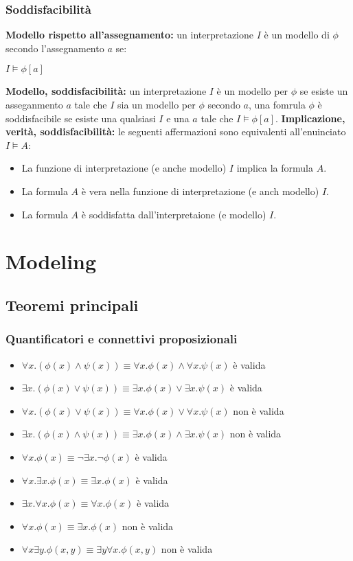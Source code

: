 \documentclass[../main.tex]{subfiles}
\newcommand{\spazio}{\vspace{1em} \newline}
\begin{document}
   \subsection{Soddisfacibilità}
   \textbf{Modello rispetto all'assegnamento:} un interpretazione $I$ è un modello di $\phi$ secondo l'assegnamento $a$ se:
   \begin{center}
      $I \models \phi [a]$
   \end{center}
   \textbf{Modello, soddisfacibilità:} un interpretazione $I$ è un modello per $\phi$ se esiste un asseganmento $a$ tale che $I$ sia un modello per $\phi$ secondo $a$, una fomrula $\phi$ è soddisfacibile se esiste una qualsiasi $I$ e una $a$ tale che $I \models \phi [a]$.
   \spazio
   \textbf{Implicazione, verità, soddisfacibilità:} le seguenti affermazioni sono equivalenti all'enuinciato $I \models A$:
   \begin{itemize}
      \item La funzione di interpretazione (e anche modello) $I$ implica la formula $A$.
      \item La formula $A$ è vera nella funzione di interpretazione (e anch modello) $I$.
      \item La formula $A$ è soddisfatta dall'interpretaione (e modello) $I$.
   \end{itemize}

   \chapter{Modeling}
   \section{Teoremi principali}
   \subsection{Quantificatori e connettivi proposizionali}
   \begin{itemize}
      \item $\forall x.(\phi (x) \land \psi (x)) \equiv \forall x .\phi (x) \land \forall x. \psi (x)$ è valida
      \item $\exists x.(\phi (x) \lor \psi (x)) \equiv \exists x. \phi (x) \lor \exists x. \psi (x)$ è valida
      \item $\forall x.(\phi (x) \lor \psi (x)) \equiv \forall x. \phi (x) \lor \forall x. \psi (x)$ non è valida 
      \item $\exists x.(\phi (x) \land \psi (x)) \equiv \exists x.\phi (x) \land \exists x. \psi (x)$ non è valida
      \item $\forall x.\phi(x) \equiv \lnot \exists x.\lnot \phi(x)$ è valida
      \item $\forall x.\exists x.\phi(x) \equiv \exists x.\phi(x)$ è valida
      \item $\exists x.\forall x.\phi(x) \equiv \forall x.\phi(x)$ è valida
      \item $\forall x.\phi(x) \equiv \exists x.\phi(x)$ non è valida 
      \item $\forall x\exists y.\phi(x, y) \equiv \exists y\forall x.\phi(x, y)$ non è valida 
   \end{itemize}
\end{document}
